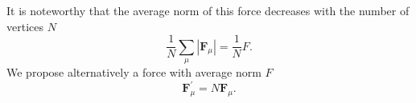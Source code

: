 \documentclass[aps, superscriptaddress, notitlepage, longbibliography]{revtex4-1}
\begin{document}
It is noteworthy that the average norm of this force decreases with the number of vertices $N$
\begin{equation}
\frac{1}{N} \sum_{\mu} |\boldsymbol{F}_{\mu}| = \frac{1}{N} F.
\end{equation}
We propose alternatively a force with average norm $F$
\begin{equation}
\boldsymbol{F}^{\prime}_{\mu} = N \boldsymbol{F}_{\mu}.
\end{equation}


\end{document}
